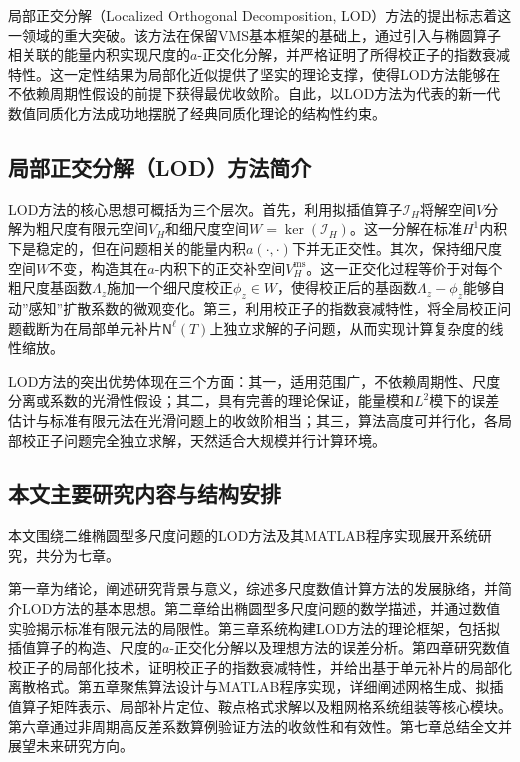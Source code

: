 \documentclass[
]{article}
\begin{document}
局部正交分解（Localized Orthogonal Decomposition, LOD）方法的提出标志着这一领域的重大突破。该方法在保留VMS基本框架的基础上，通过引入与椭圆算子相关联的能量内积实现尺度的\(a\)-正交化分解，并严格证明了所得校正子的指数衰减特性。这一定性结果为局部化近似提供了坚实的理论支撑，使得LOD方法能够在不依赖周期性假设的前提下获得最优收敛阶。自此，以LOD方法为代表的新一代数值同质化方法成功地摆脱了经典同质化理论的结构性约束\autocite{malqvist2014localization,malqvist2021numerical}。

\subsection{局部正交分解（LOD）方法简介}\label{chap-1-3}

LOD方法的核心思想可概括为三个层次。首先，利用拟插值算子\(\mathcal{I}_H\)将解空间\(V\)分解为粗尺度有限元空间\(V_H\)和细尺度空间\(W = \ker(\mathcal{I}_H)\)。这一分解在标准\(H^1\)内积下是稳定的，但在问题相关的能量内积\(a(\cdot, \cdot)\)下并无正交性。其次，保持细尺度空间\(W\)不变，构造其在\(a\)-内积下的正交补空间\(V_H^{\mathrm{ms}}\)。这一正交化过程等价于对每个粗尺度基函数\(\Lambda_z\)施加一个细尺度校正\(\phi_z \in W\)，使得校正后的基函数\(\Lambda_z - \phi_z\)能够自动''感知''扩散系数的微观变化。第三，利用校正子的指数衰减特性，将全局校正问题截断为在局部单元补片\(\mathsf{N}^\ell(T)\)上独立求解的子问题，从而实现计算复杂度的线性缩放。

LOD方法的突出优势体现在三个方面：其一，适用范围广，不依赖周期性、尺度分离或系数的光滑性假设；其二，具有完善的理论保证，能量模和\(L^2\)模下的误差估计与标准有限元法在光滑问题上的收敛阶相当；其三，算法高度可并行化，各局部校正子问题完全独立求解，天然适合大规模并行计算环境。

\subsection{本文主要研究内容与结构安排}\label{chap-1-4}

本文围绕二维椭圆型多尺度问题的LOD方法及其MATLAB程序实现展开系统研究，共分为七章。

第一章为绪论，阐述研究背景与意义，综述多尺度数值计算方法的发展脉络，并简介LOD方法的基本思想。第二章给出椭圆型多尺度问题的数学描述，并通过数值实验揭示标准有限元法的局限性。第三章系统构建LOD方法的理论框架，包括拟插值算子的构造、尺度的\(a\)-正交化分解以及理想方法的误差分析。第四章研究数值校正子的局部化技术，证明校正子的指数衰减特性，并给出基于单元补片的局部化离散格式。第五章聚焦算法设计与MATLAB程序实现，详细阐述网格生成、拟插值算子矩阵表示、局部补片定位、鞍点格式求解以及粗网格系统组装等核心模块。第六章通过非周期高反差系数算例验证方法的收敛性和有效性。第七章总结全文并展望未来研究方向。
\end{document}
